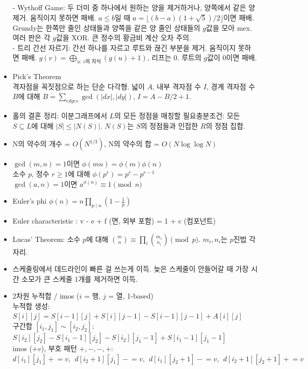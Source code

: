 \documentclass[landscape, 8pt, a4paper, oneside]{extarticle}
\begin{document}
\begin{multicols*}{3}
\begin{itemize}
    - Wythoff Game: 두 더미 중 하나에서 원하는 양을 제거하거나, 양쪽에서 같은 양 제거. 움직이지 못하면 패배. $a\le b$일 때 $a=\lfloor(b-a)(1+\sqrt5)/2\rfloor$이면 패배. Grundy는 한쪽만 줄인 상태들과 양쪽을 같은 양 줄인 상태들의 $g$값을 모아 mex. 여러 판은 각 $g$값을 XOR. 큰 정수의 황금비 계산 오차 주의.\\
    - 트리 간선 자르기: 간선 하나를 자르고 루트와 끊긴 부분을 제거. 움직이지 못하면 패배. $g(v)=\bigoplus_{u:\,v\text{의 자식}}(g(u)+1)$, 리프는 0. 루트의 $g$값이 0이면 패배.
    \item Pick’s Theorem\\
    격자점을 꼭짓점으로 하는 단순 다각형. 넓이 $A$, 내부 격자점 수 $I$, 경계 격자점 수 $B$에 대해 $B=\sum_{edges}\gcd(|dx|,|dy|)$, $I=A-B/2+1$.
    \item 홀의 결혼 정리: 이분그래프에서 $L$의 모든 정점을 매칭할 필요충분조건: 모든 $S\subseteq L$에 대해 $|S|\le|N(S)|$. $N(S)$는 $S$의 정점들과 인접한 $R$의 정점 집합.
    \item N의 약수의 개수 = $O(N^{1/3})$, N의 약수의 합 = $O(N \log \log N)$
    \item \(\gcd(m,n)=1\)이면 \(\phi(mn)=\phi(m)\phi(n)\)\\
    소수 \(p\), 정수 \(r\ge1\)에 대해 \(\phi(p^r)=p^r-p^{r-1}\)\\
    \(\gcd(a,n)=1\)이면 \(a^{\phi(n)}\equiv1\pmod n\)
    \item Euler's phi $\phi (n)=n\prod _{p\mid n}\left(1-{\frac {1}{p}}\right)$
    \item Euler characteristic : v - e + f (면, 외부 포함) = 1 + c (컴포넌트)
    \item Lucas' Theorem: 소수 $p$에 대해 $\binom{m}{n}\equiv\prod_i\binom{m_i}{n_i}\pmod p$. $m_i,n_i$는 $p$진법 각 자리.
    \item 스케줄링에서 데드라인이 빠른 걸 쓰는게 이득. 늦은 스케줄이 안들어갈 때 가장 시간 소모가 큰 스케줄 1개를 제거하면 이득.
    \item 2차원 누적합 / imos ($i$ = 행, $j$ = 열, 1-based)\\
    누적합 생성: $S[i][j] = S[i-1][j] + S[i][j-1] - S[i-1][j-1] + A[i][j]$\\
    구간합 $[i_1,j_1]\sim[i_2,j_2]$: $S[i_2][j_2] - S[i_1-1][j_2] - S[i_2][j_1-1] + S[i_1-1][j_1-1]$\\
    imos ($+v$), 부호 패턴 $+,-,-,+$:\\
    $d[i_1][j_1] \mathrel{+}= v,\ \ d[i_2+1][j_1] \mathrel{-}= v,\ \ d[i_1][j_2+1] \mathrel{-}= v,\ \ d[i_2+1][j_2+1] \mathrel{+}= v$\\

\end{itemize}
\end{multicols*}
\end{document}
